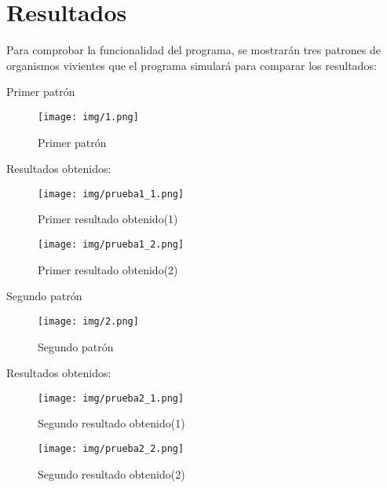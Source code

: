 \section{Resultados}
	Para comprobar la funcionalidad del programa, se mostrarán tres patrones de organismos vivientes que el programa simulará para comparar los resultados:

	Primer patrón
	\begin{figure}[H]
		\begin{center}
			\texttt{[image: img/1.png]}
			\caption{Primer patrón}
			\label{fig:patron1}
		\end{center}
	\end{figure}

	Resultados obtenidos:
	\begin{figure}[H]
		\begin{center}
			\texttt{[image: img/prueba1\_1.png]}
			\caption{Primer resultado obtenido(1)}
			\label{fig:prueba1_1}
		\end{center}
	\end{figure}
	\begin{figure}[H]
		\begin{center}
			\texttt{[image: img/prueba1\_2.png]}
			\caption{Primer resultado obtenido(2)}
			\label{fig:prueba1_2}
		\end{center}
	\end{figure}

	Segundo patrón
	\begin{figure}[H]
		\begin{center}
			\texttt{[image: img/2.png]}
			\caption{Segundo patrón}
			\label{fig:patron2}
		\end{center}
	\end{figure}

	Resultados obtenidos:
	\begin{figure}[H]
		\begin{center}
			\texttt{[image: img/prueba2\_1.png]}
			\caption{Segundo resultado obtenido(1)}
			\label{fig:prueba2_1}
		\end{center}
	\end{figure}
	\begin{figure}[H]
		\begin{center}
			\texttt{[image: img/prueba2\_2.png]}
			\caption{Segundo resultado obtenido(2)}
			\label{fig:prueba2_2}
		\end{center}
	\end{figure}

